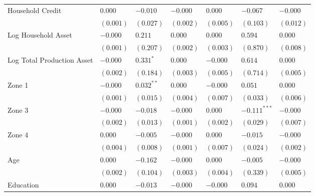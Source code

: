 \begin{tabular}{lllllll}
Household Credit                        &     $0.000$ &         $-0.010$ &     $-0.000$ &       $0.000$ &         $-0.067$ &      $-0.000$ \\
                                        &   $(0.001)$ &        $(0.027)$ &    $(0.002)$ &     $(0.005)$ &        $(0.103)$ &     $(0.012)$ \\
Log Household Asset                     &    $-0.000$ &          $0.211$ &      $0.000$ &       $0.000$ &          $0.594$ &       $0.000$ \\
                                        &   $(0.001)$ &        $(0.207)$ &    $(0.002)$ &     $(0.003)$ &        $(0.870)$ &     $(0.008)$ \\
Log Total Production Asset              &    $-0.000$ &     $0.331 ^{*}$ &      $0.000$ &      $-0.000$ &          $0.614$ &       $0.000$ \\
                                        &   $(0.002)$ &        $(0.184)$ &    $(0.003)$ &     $(0.005)$ &        $(0.714)$ &     $(0.005)$ \\
Zone 1                                  &    $-0.000$ &    $0.032 ^{**}$ &      $0.000$ &      $-0.000$ &          $0.051$ &       $0.000$ \\
                                        &   $(0.001)$ &        $(0.015)$ &    $(0.004)$ &     $(0.007)$ &        $(0.033)$ &     $(0.006)$ \\
Zone 3                                  &    $-0.000$ &         $-0.018$ &     $-0.000$ &       $0.000$ &  $-0.111 ^{***}$ &      $-0.000$ \\
                                        &   $(0.002)$ &        $(0.013)$ &    $(0.001)$ &     $(0.002)$ &        $(0.029)$ &     $(0.007)$ \\
Zone 4                                  &     $0.000$ &         $-0.005$ &     $-0.000$ &       $0.000$ &         $-0.015$ &      $-0.000$ \\
                                        &   $(0.004)$ &        $(0.008)$ &    $(0.001)$ &     $(0.007)$ &        $(0.024)$ &     $(0.002)$ \\
Age                                     &     $0.000$ &         $-0.162$ &     $-0.000$ &       $0.000$ &         $-0.005$ &      $-0.000$ \\
                                        &   $(0.002)$ &        $(0.104)$ &    $(0.003)$ &     $(0.004)$ &        $(0.339)$ &     $(0.005)$ \\
Education                               &     $0.000$ &         $-0.013$ &     $-0.000$ &      $-0.000$ &          $0.094$ &       $0.000$ \\

\end{tabular}
